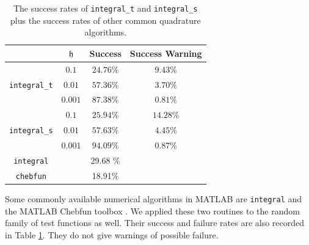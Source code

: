 \documentclass{iitthesis}
\theoremstyle{definition}
\theoremstyle{remark}
\begin{document}
\begin{table}[ht]
\caption{The success rates of {\tt integral\_t} and {\tt integral\_s} plus the success rates of other common quadrature algorithms.}
\centering
\begin{tabular}{cccc}
\hline\hline
& $\mathfrak{h}$ & Success & Success Warning \\
\hline
&$0.1$  & $24.76\%$ &  $9.43\%$  \\
{\tt integral\_t}
 &$0.01$  & $57.36\%$ & $3.70\%$ \\
&$0.001$ & $87.38\%$ &$0.81\%$ \\
\hline
&$0.1$  & $25.94\%$ &  $14.28\%$  \\
{\tt integral\_s}
 &$0.01$  & $57.63\%$ & $4.45\%$ \\
&$0.001$ & $94.09\%$ &$0.87\%$ \\
\hline
{\tt integral} & & 29.68 \% & \\
{\tt chebfun} & &18.91\% & \\
\hline
\end{tabular}
\label{integresultstable}
\end{table}

Some commonly available numerical algorithms in MATLAB are {\tt integral} \cite{MAT8.1} and the MATLAB Chebfun toolbox \cite{TrefEtal12}. We applied these two routines to the random family of test functions as well.  Their success and failure rates are also recorded in Table \ref{integresultstable}.  They do not give warnings of possible failure.
\end{document}

